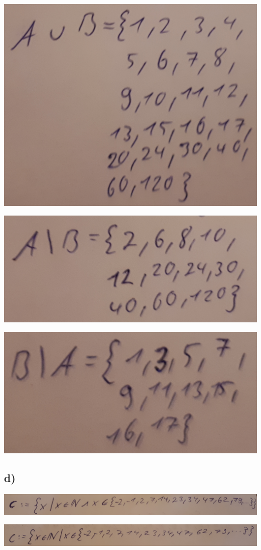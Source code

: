 \includegraphics[width=\textwidth]{part/S1A1MAVB}

\includegraphics[width=\textwidth]{part/S1A1MAMB}

\includegraphics[width=\textwidth]{part/S1A1MBMA}

\subsection*{d)}
\includegraphics[width=\textwidth]{part/S1A1MC1}

\includegraphics[width=\textwidth]{part/S1A1MC2}

\clearpage